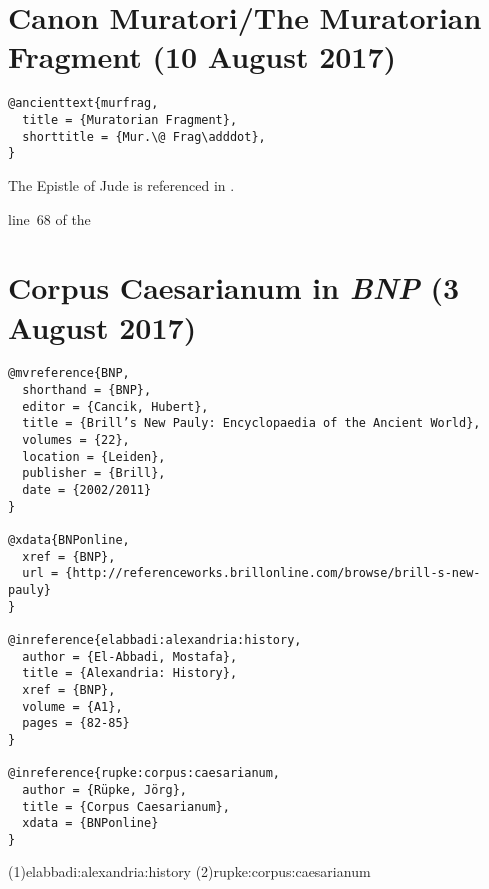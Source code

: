 \documentclass[a4paper]{article}
\begin{document}

\section{Canon Muratori/The Muratorian Fragment (10 August 2017)}

\begin{verbatim}
@ancienttext{murfrag,
  title = {Muratorian Fragment},
  shorttitle = {Mur.\@ Frag\adddot},
}
\end{verbatim}

\begin{verbcite}
  The Epistle of Jude is referenced in \cite[(68)]{murfrag}.
\end{verbcite}
\begin{verbcite}
  \parencite[(\lineno~68)]{murfrag}
\end{verbcite}
\begin{verbcite}
  line~68 of the 
\end{verbcite}
\exampleancientsources
{}

\section{Corpus Caesarianum in \emph{BNP} (3 August 2017)}

\begin{verbatim}
@mvreference{BNP,
  shorthand = {BNP},
  editor = {Cancik, Hubert},
  title = {Brill’s New Pauly: Encyclopaedia of the Ancient World},
  volumes = {22},
  location = {Leiden},
  publisher = {Brill},
  date = {2002/2011}
}

@xdata{BNPonline,
  xref = {BNP},
  url = {http://referenceworks.brillonline.com/browse/brill-s-new-pauly}
}

@inreference{elabbadi:alexandria:history,
  author = {El-Abbadi, Mostafa},
  title = {Alexandria: History},
  xref = {BNP},
  volume = {A1},
  pages = {82-85}
}

@inreference{rupke:corpus:caesarianum,
  author = {Rüpke, Jörg},
  title = {Corpus Caesarianum},
  xdata = {BNPonline}
}
\end{verbatim}

\examplecite(1){elabbadi:alexandria:history}
\examplecite(2){rupke:corpus:caesarianum}
\exampleabbreviations
\examplebibliography
{}
\end{document}
